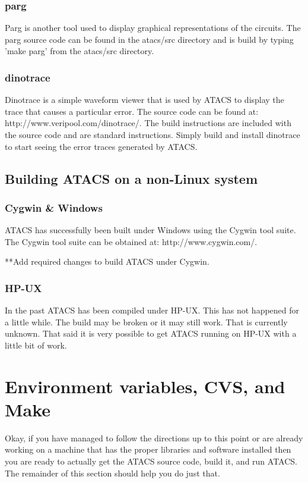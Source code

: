 \documentclass[titlepage,11pt]{article}
\begin{document}
  \subsubsection{parg}
  Parg is another tool used to display graphical representations of
  the circuits.  The parg source code can be found in the atacs/src
  directory and is build by typing 'make parg' from the atacs/src
  directory.  

  \subsubsection{dinotrace}
  Dinotrace is a simple waveform viewer that is used by ATACS to
  display the trace that causes a particular error.  The source code
  can be found at: http://www.veripool.com/dinotrace/.  The build
  instructions are included with the source code and are standard
  instructions.  Simply build and install dinotrace to start seeing
  the error traces generated by ATACS.
  
  \subsection{Building ATACS on a non-Linux system}

  \subsubsection{Cygwin \& Windows}
  ATACS has successfully been built under Windows using the Cygwin
  tool suite.  The Cygwin tool suite can be obtained at:
  http://www.cygwin.com/.

  **Add required changes to build ATACS under Cygwin.
  
  \subsubsection{HP-UX}
  In the past ATACS has been compiled under HP-UX.  This has not
  happened for a little while.  The build may be broken or it may
  still work.  That is currently unknown.  That said it is very
  possible to get ATACS running on HP-UX with a little bit of work.

  \section{Environment variables, CVS, and Make}
  Okay, if you have managed to follow the directions up to this point
  or are already working on a machine that has the proper libraries
  and software installed then you are ready to actually get the ATACS
  source code, build it, and run ATACS.  The remainder of this section
  should help you do just that.
  
\end{document}
